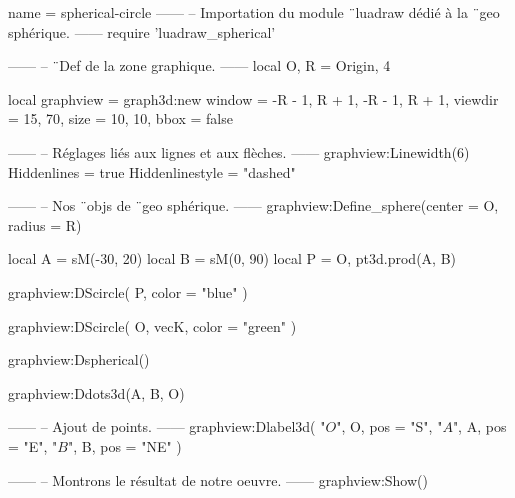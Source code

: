 \documentclass[border = 3pt]{standalone}
\begin{document}
\begin{luadraw*}{name = spherical-circle}
------
-- Importation du module ¨luadraw dédié à la ¨geo sphérique.
------
require 'luadraw_spherical'

------
-- ¨Def de la zone graphique.
------
local O, R = Origin, 4

local graphview = graph3d:new{
  window  = {-R - 1, R + 1, -R - 1, R + 1},
  viewdir = {15, 70},
  size    = {10, 10},
  bbox    = false
}

------
-- Réglages liés aux lignes et aux flèches.
------
graphview:Linewidth(6)
Hiddenlines     = true
Hiddenlinestyle = "dashed"

------
-- Nos ¨objs de ¨geo sphérique.
------
graphview:Define_sphere({center = O, radius = R})

local A = sM(-30, 20)
local B = sM(0, 90)
local P = {O, pt3d.prod(A, B)}

graphview:DScircle(
  P,
  {color = "blue"}
)

graphview:DScircle(
  {O, vecK},
  {color = "green"}
)

graphview:Dspherical()

graphview:Ddots3d({A, B, O})

------
-- Ajout de points.
------
graphview:Dlabel3d(
  "$O$", O, {pos = "S"},
  "$A$", A, {pos = "E"},
  "$B$", B, {pos = "NE"}
)

------
-- Montrons le résultat de notre oeuvre.
------
graphview:Show()
\end{luadraw*}
\end{document}
